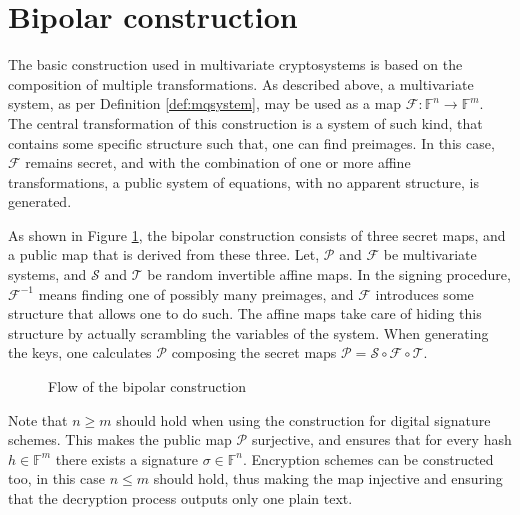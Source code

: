 \documentclass{ufsctex/ufsctex}
\begin{document}
\section{Bipolar construction}\label{sec:bipolar}

The basic construction used in multivariate cryptosystems is based on the
composition of multiple transformations. As described above, a multivariate
system, as per Definition \ref{def:mqsystem}, may be used as a map
$\mathcal{F}:\mathbb{F}^n\to\mathbb{F}^m$. The central transformation of this
construction is a system of such kind, that contains some specific structure
such that, one can find preimages. In this case, $\mathcal{F}$ remains secret,
and with the combination of one or more affine transformations, a public system
of equations, with no apparent structure, is generated.

As shown in Figure \ref{fig:bipolar}, the bipolar construction consists of
three secret maps, and a public map that is derived from these three.  Let,
$\mathcal{P}$ and $\mathcal{F}$ be multivariate systems, and $\mathcal{S}$ and
$\mathcal{T}$ be random invertible affine maps. In the signing procedure,
$\mathcal{F}^{-1}$ means finding one of possibly many preimages, and
$\mathcal{F}$ introduces some structure that allows one to do such. The affine
maps take care of hiding this structure by actually scrambling the variables of
the system. When generating the keys, one calculates $\mathcal{P}$ composing
the secret maps $\mathcal{P} = \mathcal{S} \circ \mathcal{F} \circ
\mathcal{T}$.

\begin{figure}
\centering
{}
\caption{Flow of the bipolar construction}\label{fig:bipolar}
\end{figure}

Note that $n \geq m$ should hold when using the construction for digital
signature schemes. This makes the public map $\mathcal{P}$ surjective, and
ensures that for every hash $h \in \mathbb{F}^m$ there exists a signature
$\sigma \in \mathbb{F}^n$. Encryption schemes can be constructed too, in this
case $n \leq m$ should hold, thus making the map injective and ensuring that
the decryption process outputs only one plain text.
\end{document}
